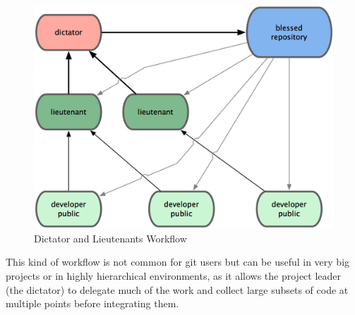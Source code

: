 \begin{figure}[thbp]
  \centering
  \includegraphics[width=.8\textwidth]{git-model-2.png}
  \caption{Dictator and Lieutenants Workflow}\label{fig:git-model-2}
\end{figure}

This kind of workflow is not common for git users but can be useful in
very big projects or in highly hierarchical environments, as it allows
the project leader (the dictator) to delegate much of the work and
collect large subsets of code at multiple points before integrating
them.




